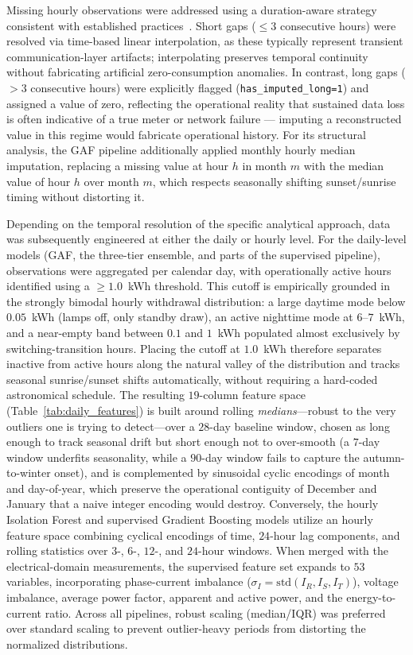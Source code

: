 \documentclass{article}
\begin{document}
Missing hourly observations were addressed using a duration-aware strategy consistent with established practices~\cite{littlerubin2019}. Short gaps ($\leq 3$ consecutive hours) were resolved via time-based linear interpolation, as these typically represent transient communication-layer artifacts; interpolating preserves temporal continuity without fabricating artificial zero-consumption anomalies. In contrast, long gaps ($>3$ consecutive hours) were explicitly flagged (\texttt{has\_imputed\_long=1}) and assigned a value of zero, reflecting the operational reality that sustained data loss is often indicative of a true meter or network failure --- imputing a reconstructed value in this regime would fabricate operational history. For its structural analysis, the GAF pipeline additionally applied monthly hourly median imputation, replacing a missing value at hour $h$ in month $m$ with the median value of hour $h$ over month $m$, which respects seasonally shifting sunset/sunrise timing without distorting it.

Depending on the temporal resolution of the specific analytical approach, data was subsequently engineered at either the daily or hourly level. For the daily-level models (GAF, the three-tier ensemble, and parts of the supervised pipeline), observations were aggregated per calendar day, with operationally active hours identified using a $\geq 1.0$~kWh threshold. This cutoff is empirically grounded in the strongly bimodal hourly withdrawal distribution: a large daytime mode below $0.05$~kWh (lamps off, only standby draw), an active nighttime mode at $6$--$7$~kWh, and a near-empty band between $0.1$ and $1$~kWh populated almost exclusively by switching-transition hours. Placing the cutoff at $1.0$~kWh therefore separates inactive from active hours along the natural valley of the distribution and tracks seasonal sunrise/sunset shifts automatically, without requiring a hard-coded astronomical schedule. The resulting $19$-column feature space (Table~\ref{tab:daily_features}) is built around rolling \emph{medians}---robust to the very outliers one is trying to detect---over a $28$-day baseline window, chosen as long enough to track seasonal drift but short enough not to over-smooth (a $7$-day window underfits seasonality, while a $90$-day window fails to capture the autumn-to-winter onset), and is complemented by sinusoidal cyclic encodings of month and day-of-year, which preserve the operational contiguity of December and January that a naive integer encoding would destroy. Conversely, the hourly Isolation Forest and supervised Gradient Boosting models utilize an hourly feature space combining cyclical encodings of time, $24$-hour lag components, and rolling statistics over $3$-, $6$-, $12$-, and $24$-hour windows. When merged with the electrical-domain measurements, the supervised feature set expands to $53$ variables, incorporating phase-current imbalance ($\sigma_I = \mathrm{std}(I_R, I_S, I_T)$), voltage imbalance, average power factor, apparent and active power, and the energy-to-current ratio. Across all pipelines, robust scaling (median/IQR) was preferred over standard scaling to prevent outlier-heavy periods from distorting the normalized distributions.
\end{document}
